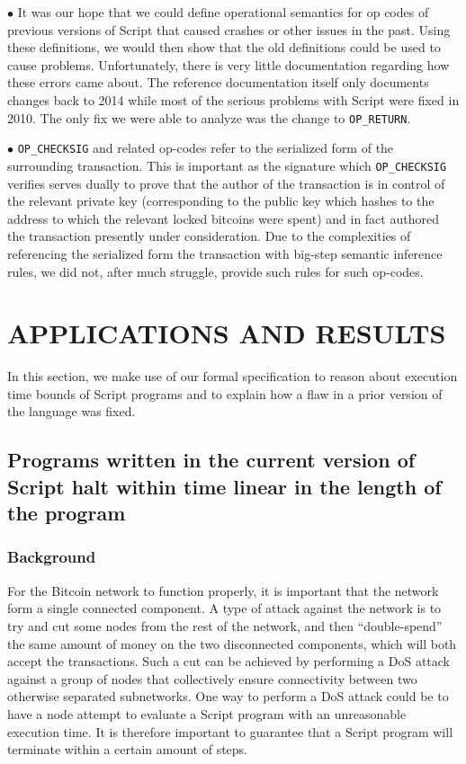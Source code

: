 \documentclass[letterpaper, 10 pt, conference]{ieeeconf}
\begin{document}
$\bullet$ It was our hope that we could define operational semantics for op codes of previous versions of Script that caused crashes or other issues in the past.  Using these definitions, we would then show that the old definitions could be used to cause problems.  Unfortunately, there is very little documentation regarding how these errors came about.  The reference documentation itself only documents changes back to 2014 while most of the serious problems with Script were fixed in 2010. The only fix we were able to analyze was the change to \texttt{OP\_RETURN}.

$\bullet$ \texttt{OP\_CHECKSIG} and related op-codes refer to the serialized form of the surrounding transaction. This is important as the signature which \texttt{OP\_CHECKSIG} verifies serves dually to prove that the author of the transaction is in control of the relevant private key (corresponding to the public key which hashes to the address to which the relevant locked bitcoins were spent) and in fact authored the transaction presently under consideration. Due to the complexities of referencing the serialized form the transaction with big-step semantic inference rules, we did not, after much struggle, provide such rules for such op-codes.

\section{APPLICATIONS AND RESULTS}

In this section, we make use of our formal specification to reason about execution time bounds of Script programs and to explain how a flaw in a prior version of the language was fixed.

\subsection{Programs written in the current version of Script halt within time linear in the length of the program}

\subsubsection{Background}
For the Bitcoin network to function properly, it is important that the network form a single connected component. A type of attack against the network is to try and cut some nodes from the rest of the network, and then ``double-spend'' the same amount of money on the two disconnected components, which will both accept the transactions. Such a cut can be achieved by performing a DoS attack against a group of nodes that collectively ensure connectivity between two otherwise separated subnetworks. One way to perform a DoS attack could be to have a node attempt to evaluate a Script program with an unreasonable execution time. It is therefore important to guarantee that a Script program will terminate within a certain amount of steps.
\end{document}
